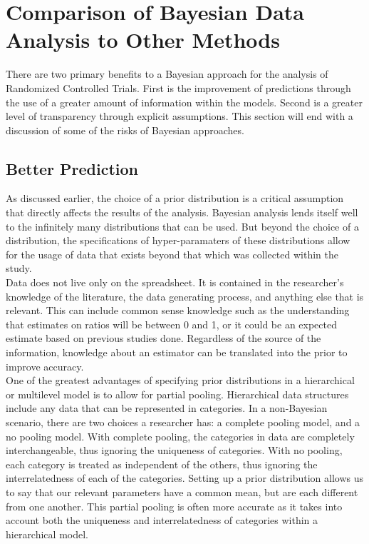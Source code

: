 \documentclass[12pt, oneside]{article}
\begin{document}
\section{Comparison of Bayesian Data Analysis to Other Methods}
There are two primary benefits to a Bayesian approach for the analysis of Randomized Controlled Trials. First is the improvement of predictions through the use of a greater amount of information within the models. Second is a greater level of transparency through explicit assumptions. This section will end with a discussion of some of the risks of Bayesian approaches.
\subsection{Better Prediction}
As discussed earlier, the choice of a prior distribution is a critical assumption that directly affects the results of the analysis. Bayesian analysis lends itself well to the infinitely many distributions that can be used. But beyond the choice of a distribution, the specifications of hyper-paramaters of these distributions allow for the usage of data that exists beyond that which was collected within the study.\\

Data does not live only on the spreadsheet. It is contained in the researcher's knowledge of the literature, the data generating process, and anything else that is relevant. This can include common sense knowledge such as the understanding that estimates on ratios will be between 0 and 1, or it could be an expected estimate based on previous studies done. Regardless of the source of the information, knowledge about an estimator can be translated into the prior to improve accuracy. \\

One of the greatest advantages of specifying prior distributions in a hierarchical or multilevel model is to allow for partial pooling. Hierarchical data structures include any data that can be represented in categories. In a non-Bayesian scenario, there are two choices a researcher has: a complete pooling model, and a no pooling model. With complete pooling, the categories in data are completely interchangeable, thus ignoring the uniqueness of categories. With no pooling, each category is treated as independent of the others, thus ignoring the interrelatedness of each of the categories. Setting up a prior distribution allows us to say that our relevant parameters have a common mean, but are each different from one another. This partial pooling is often more accurate as it takes into account both the uniqueness and interrelatedness of categories within a hierarchical model.\\
\end{document}
